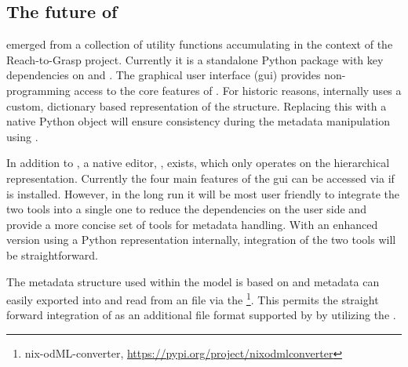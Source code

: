 \subsection{The future of }
 emerged from a collection of  utility functions accumulating in the context of the Reach-to-Grasp project. Currently it is a standalone Python package with key dependencies on  and . The graphical user interface (gui) provides non-programming access to the core features of . For historic reasons,  internally uses a custom, dictionary based representation of the  structure. Replacing this with a native  Python object will ensure consistency during the metadata manipulation using .

In addition to , a native  editor, , exists, which only operates on the hierarchical  representation. Currently the four main features of the  gui can be accessed via  if  is installed. However, in the long run it will be most user friendly to integrate the two tools into a single one to reduce the dependencies on the user side and provide a more concise set of tools for metadata handling. With an enhanced  version using a Python  representation internally, integration of the two tools will be straightforward.

The metadata structure used within the  model is based on  and metadata can easily exported into and read from an  file via the \footnote{nix-odML-converter, \url{https://pypi.org/project/nixodmlconverter}}. This permits the straight forward integration of  as an additional file format supported by  by utilizing the .

